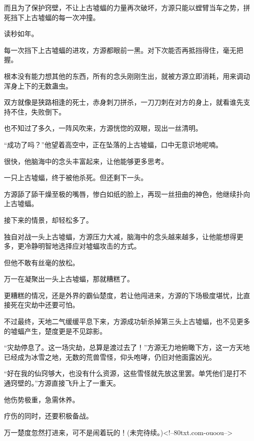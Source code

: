 \begin{this_body}
而且为了保护窍壁，不让上古墟蝠的力量再次破坏，方源只能以螳臂当车之势，拼死挡下上古墟蝠的每一次冲撞。

读秒如年。

每一次挡下上古墟蝠的进攻，方源都眼前一黑。对下次能否再抵挡得住，毫无把握。

根本没有能力想其他的东西，所有的念头刚刚生出，就被方源立即消耗，用来调动浑身上下的无数蛊虫。

双方就像是狭路相逢的死士，赤身刺刀拼杀，一刀刀刺在对方的身上，就看谁先支持不住，失败倒下。

也不知过了多久，一阵风吹来，方源恍惚的双眼，现出一丝清明。

“成功了吗？”他望着高空中，正在坠落的上古墟蝠，口中无意识地呢喃。

很快，他脑海中的念头丰富起来，让他能够更多思考。

一只上古墟蝠，终于被他杀死。但还剩下一头。

方源舔了舔干燥至极的嘴唇，惨白如纸的脸上，再现一丝扭曲的神色，他继续扑向上古墟蝠。

接下来的情景，却轻松多了。

独自对战一头上古墟蝠，方源压力大减，脑海中的念头越来越多，让他能想得更多，更冷静明智地选择应对墟蝠攻击的方式。

但他不敢有丝毫的放松。

万一在凝聚出一头上古墟蝠，那就糟糕了。

更糟糕的情况，还是外界的霸仙楚度，若让他闯进来，方源的下场极度堪忧，比直接死在灾劫中还要可怕。

不过最终，天地二气缓缓平息下来，方源成功斩杀掉第三头上古墟蝠，也不见更多的墟蝠产生，楚度更是不见踪影。

“灾劫停息了。这一场灾劫，总算是渡过去了！”方源无力地俯瞰下方，这一方天地已经成为冰雪之地，无数的荒兽雪怪，仰头咆哮，仍旧对他面露凶光。

“好在我的仙窍够大，也没有什么资源，这些雪怪就先放这里罢。单凭他们是打不通窍壁的。”方源直接飞升上了一重天。

他伤势极重，急需休养。

疗伤的同时，还要积极备战。

万一楚度忽然打进来，可不是闹着玩的！(未完待续。)<!--80txt.com-ouoou-->

\end{this_body}

